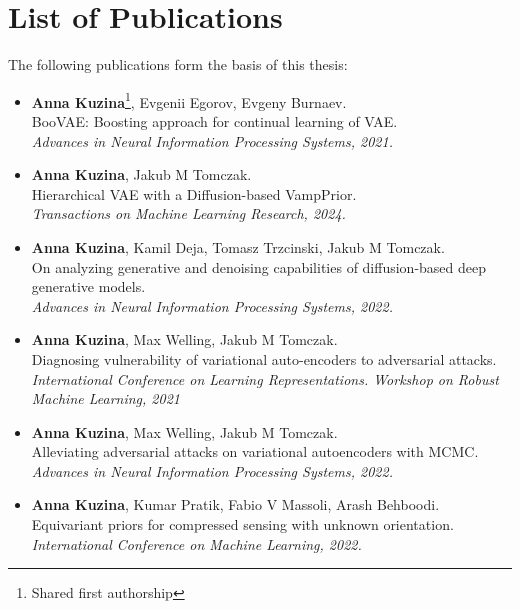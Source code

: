 \section{List of Publications}
The following publications form the basis of this thesis:

\begin{itemize}[leftmargin=15pt, rightmargin=10pt]
    \item \textbf{Anna Kuzina}\footnote[1]{Shared first authorship}, Evgenii Egorov\footnotemark[1], Evgeny Burnaev. \\
    BooVAE: Boosting approach for continual learning of VAE. \\
    \textit{Advances in Neural Information Processing Systems, 2021.}
    \item  \textbf{Anna Kuzina},  Jakub M Tomczak. \\ 
    Hierarchical VAE with a Diffusion-based VampPrior.\\
    \textit{Transactions on Machine Learning Research, 2024.}
    \item \textbf{Anna Kuzina}\footnotemark[1], Kamil Deja\footnotemark[1], Tomasz Trzcinski, Jakub M Tomczak. \\
    On analyzing generative and denoising capabilities of diffusion-based deep generative models. \\
    \textit{Advances in Neural Information Processing Systems, 2022.}
    \item \textbf{Anna Kuzina}, Max Welling, Jakub M Tomczak.  \\
    Diagnosing vulnerability of variational auto-encoders to adversarial attacks. \\
    \textit{International Conference on Learning Representations. Workshop on Robust Machine Learning, 2021}
    \item \textbf{Anna Kuzina}, Max Welling, Jakub M Tomczak.  \\
    Alleviating adversarial attacks on variational autoencoders with MCMC. \\
    \textit{Advances in Neural Information Processing Systems, 2022.}
    \item \textbf{Anna Kuzina}, Kumar Pratik, Fabio V Massoli, Arash Behboodi.\\ 
    Equivariant priors for compressed sensing with unknown orientation. \\
    \textit{International Conference on Machine Learning, 2022.}
\end{itemize}

